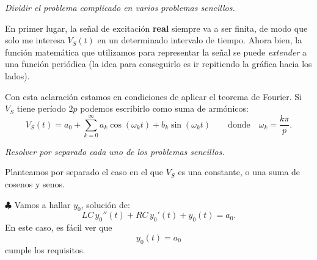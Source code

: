 \begin{enumerate}[{\bfseries [1]}]
  \item\textit{\color{blue} Dividir el problema complicado en varios problemas sencillos.}

    En primer lugar, la señal de excitación \textbf{real} siempre va a ser finita, de modo que solo me interesa $V_S(t)$ en un determinado intervalo de tiempo. Ahora bien, la función matemática que utilizamos para representar la señal se puede \textit{extender} a una función periódica (la idea para conseguirlo es ir repitiendo la gráfica hacia los lados).


Con esta aclaración estamos en condiciones de aplicar el teorema de Fourier. Si $V_S$ tiene período $2p$ podemos escribirlo como suma de armónicos:
\[
V_S(t) = a_0 + \sum_{k=0}^{\infty} a_k \cos(\omega_kt) + b_k \sin(\omega_kt)\qquad \text{donde}\quad \omega_k=\frac{k\pi}{p}.
\]
  \item \textit{\color{blue}Resolver por separado cada uno de los problemas sencillos.}

Planteamos por separado el caso en el que $V_S$ es una constante, o una suma de cosenos y senos.

 $\clubsuit$ Vamos a hallar $y_0$, solución de:
\[
LC \,y_0 '' (t) + RC\, y_0'(t) + y_0(t) = a_0.
\]
En este caso, es fácil ver que
\[\boxed{
y_0(t) = a_0
}\]
cumple los requisitos.


\end{enumerate}
